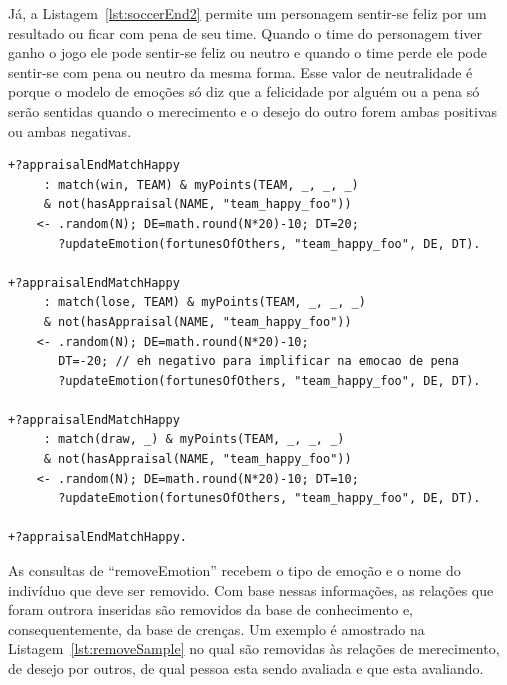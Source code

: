Já, a Listagem~\ref{lst:soccerEnd2} permite um personagem sentir-se feliz
por um resultado ou ficar com pena de seu time. Quando o time do personagem
tiver ganho o jogo ele pode sentir-se feliz ou neutro e quando o time perde
ele pode sentir-se com pena ou neutro da mesma forma. Esse valor de
neutralidade é porque o modelo de emoções só diz que a felicidade por alguém
ou a pena só serão sentidas quando o merecimento e o desejo do outro forem
ambas positivas ou ambas negativas.

\begin{center}
    \begin{minipage}{140mm}
	\lstset{linewidth=140mm}
	\begin{lstlisting}[frame=trbl,
caption=Parte do código do agente referente à avaliação do final do jogo,
label=lst:soccerEnd2]
+?appraisalEndMatchHappy
     : match(win, TEAM) & myPoints(TEAM, _, _, _)
     & not(hasAppraisal(NAME, "team_happy_foo"))
    <- .random(N); DE=math.round(N*20)-10; DT=20;
       ?updateEmotion(fortunesOfOthers, "team_happy_foo", DE, DT).

+?appraisalEndMatchHappy
     : match(lose, TEAM) & myPoints(TEAM, _, _, _)
     & not(hasAppraisal(NAME, "team_happy_foo"))
    <- .random(N); DE=math.round(N*20)-10;
       DT=-20; // eh negativo para implificar na emocao de pena
       ?updateEmotion(fortunesOfOthers, "team_happy_foo", DE, DT).

+?appraisalEndMatchHappy
     : match(draw, _) & myPoints(TEAM, _, _, _)
     & not(hasAppraisal(NAME, "team_happy_foo"))
    <- .random(N); DE=math.round(N*20)-10; DT=10;
       ?updateEmotion(fortunesOfOthers, "team_happy_foo", DE, DT).

+?appraisalEndMatchHappy.
	\end{lstlisting}
    \end{minipage}
\end{center}

As consultas de ``removeEmotion'' recebem o tipo de emoção e o nome do
indivíduo que deve ser removido. Com base nessas informações, as relações
que foram outrora inseridas são removidos da base de conhecimento e,
consequentemente, da base de crenças. Um exemplo é amostrado na
Listagem~\ref{lst:removeSample} no qual são removidas às relações de
merecimento, de desejo por outros, de qual pessoa esta sendo avaliada e que
esta avaliando.

